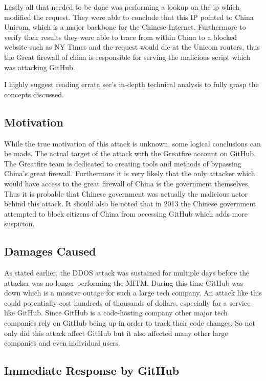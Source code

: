 \documentclass[fleqn, 12pt]{article}
\begin{document}
Lastly all that needed to be done was performing a lookup on the ip which modified the request. They were able to conclude that this IP pointed to China Unicom, which is a major backbone for the Chinese Internet. Furthermore to verify their results they were able to trace from within China to a blocked website such as NY Times and the request would die at the Unicom routers, thus the Great firewall of china is responsible for serving the malicious script which was attacking GitHub.

I highly suggest reading errata sec's in-depth technical analysis to fully grasp the concepts discussed. \cite{erratasec}

\subsection{Motivation}

While the true motivation of this attack is unknown, some logical conclusions can be made. The actual target of the attack with the Greatfire account on GitHub. The Greatfire team is dedicated to creating tools and methods of bypassing China's great firewall. \cite{ars2} Furthermore it is very likely that the only attacker which would have access to the great firewall of China is the government themselves. Thus it is probable that Chinese government was actually the malicious actor behind this attack. It should also be noted that in 2013 the Chinese government attempted to block citizens of China from accessing GitHub which adds more suspicion.

\subsection{Damages Caused}

As stated earlier, the DDOS attack was sustained for multiple days before the attacker was no longer performing the MITM. During this time GitHub was down which is a massive outage for such a large tech company. An attack like this could potentially cost hundreds of thousands of dollars, especially for a service like GitHub. Since GitHub is a code-hosting company other major tech companies rely on GitHub being up in order to track their code changes. So not only did this attack affect GitHub but it also affected many other large companies and even individual users.

\subsection{Immediate Response by GitHub}
\end{document}
